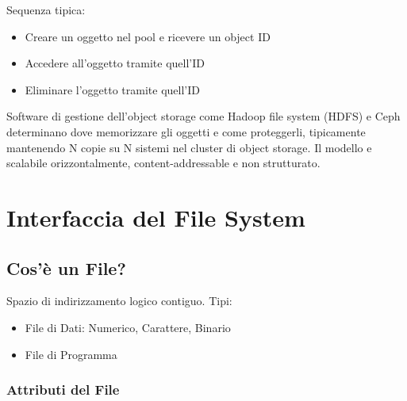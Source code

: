 Sequenza tipica:

\begin{itemize}
  \item Creare un oggetto nel pool e ricevere un object ID
  \item Accedere all'oggetto tramite quell'ID
  \item Eliminare l'oggetto tramite quell'ID
\end{itemize}

Software di gestione dell'object storage come Hadoop file system
(HDFS) e Ceph determinano dove memorizzare gli oggetti e come proteggerli,
tipicamente mantenendo N copie su N sistemi nel cluster di object storage.
Il modello e scalabile orizzontalmente, content-addressable e non strutturato.



\chapter{Interfaccia del File System}

\section{Cos'è un File?}


Spazio di indirizzamento logico contiguo. Tipi:

\begin{itemize}
  \item File di Dati: Numerico, Carattere, Binario
  \item File di Programma
\end{itemize}


\subsection{Attributi del File}

